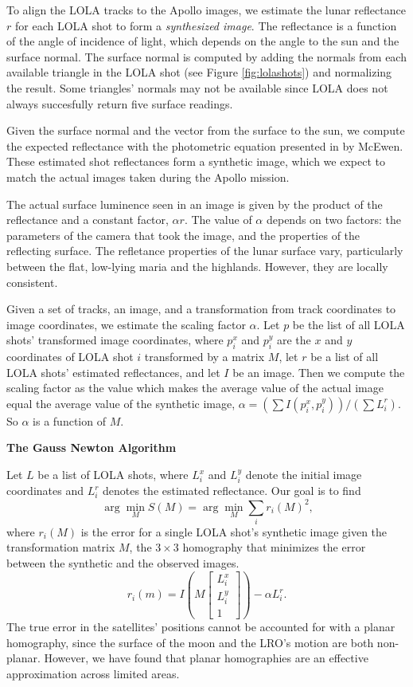 \documentclass[float=false, crop=false]{standalone}
\begin{document}
To align the LOLA tracks to the Apollo images, we estimate the lunar reflectance $r$ for each LOLA
shot to form a \emph{synthesized image}. The reflectance is a function of the angle of incidence
of light, which depends on the angle to the sun and the surface normal. The surface normal
is computed by adding the normals from each available triangle in the LOLA shot (see Figure \ref{fig:lolashots})
and normalizing the result. Some triangles' normals may not be available since LOLA does not always
succesfully return five surface readings.

Given the surface normal and the vector from the surface to the sun, we compute the expected reflectance with
the photometric equation presented in by McEwen. These estimated shot reflectances form
a synthetic image, which we expect to match the actual images taken during the Apollo mission.

The actual surface luminence seen in an image is given by the product of the reflectance and a constant factor, %
$\alpha r$. The value of $\alpha$ depends on two factors: the parameters of the camera that took the image,
and the properties of the reflecting surface. The refletance properties of the lunar surface vary, particularly
between the flat, low-lying maria and the highlands. However, they are locally consistent.

Given a set of tracks, an image, and a transformation from track coordinates to image coordinates, we estimate the scaling factor $\alpha$.
Let $p$ be the list of all LOLA shots' transformed image coordinates, where $p_i^x$ and $p_i^y$ are the $x$ and $y$
coordinates of LOLA shot $i$ transformed by a matrix $M$, let $r$ be a list of all LOLA shots' estimated reflectances, and let $I$ be an image.
Then we compute the scaling
factor as the value which makes the average value of the actual image equal the 
average value of the synthetic image, $\alpha = \left(\sum I(p_i^x, p_i^y)\right) / \left(\sum L_i^r\right)$.
So $\alpha$ is a function of $M$.

{\bf The Gauss Newton Algorithm}

Let $L$ be a list of LOLA shots, where $L_i^x$ and $L_i^y$ denote the initial image coordinates and
$L_i^r$ denotes the estimated reflectance. Our goal is to find 
$$\arg \min_M S(M) = \arg \min_M \sum_i r_i(M)^2\mbox{,}$$
where $r_i(M)$ is the error for a single LOLA shot's synthetic image given the transformation matrix $M$,
the $3 \times 3$ homography that minimizes the error between the synthetic and the observed images.
$$r_i(m) = I\left(M \left[\begin{array}{c}L_i^x\\ L_i^y\\ 1\end{array}\right]\right) - \alpha L_i^r\mbox{.}$$
The true error in the satellites' positions cannot be accounted for with a planar homography, since the
surface of the moon and the LRO's motion are both non-planar. However, we have found that planar
homographies are an effective approximation across limited areas.
\end{document}
